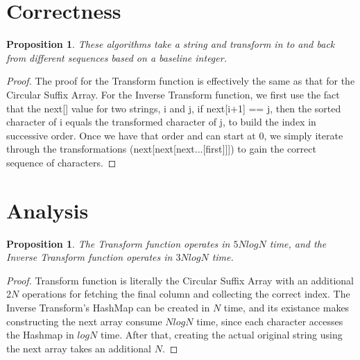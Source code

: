 \documentclass[12pt]{article}
\newtheorem{proposition}[theorem]{Proposition}
\begin{document}
\section{Correctness}

\begin{proposition}
These algorithms take a string and transform in to and back from different sequences based on a baseline integer.
\end{proposition}

\begin{proof}
The proof for the Transform function is effectively the same as that for the Circular Suffix Array. For the Inverse Transform function, we first use the fact that the next[] value for two strings, i and j, if next[i+1] == j, then the sorted character of i equals the transformed character of j, to build the index in successive order. Once we have that order and can start at 0, we simply iterate through the transformations (next[next[next...[first]]]) to gain the correct sequence of characters.
\end{proof}

\section{Analysis}

\begin{proposition}
\label{numq}
The Transform function operates in $5NlogN$ time, and the Inverse Transform function operates in $3NlogN$ time.
\end{proposition}

\begin{proof}
Transform function is literally the Circular Suffix Array with an additional 2$N$ operations for fetching the final column and collecting the correct index. The Inverse Transform's HashMap can be created in $N$ time, and its existance makes constructing the next array consume $NlogN$ time, since each character accesses the Hashmap in $logN$ time. After that, creating the actual original string using the next array takes an additional $N$.
\end{proof}


\end{document}
